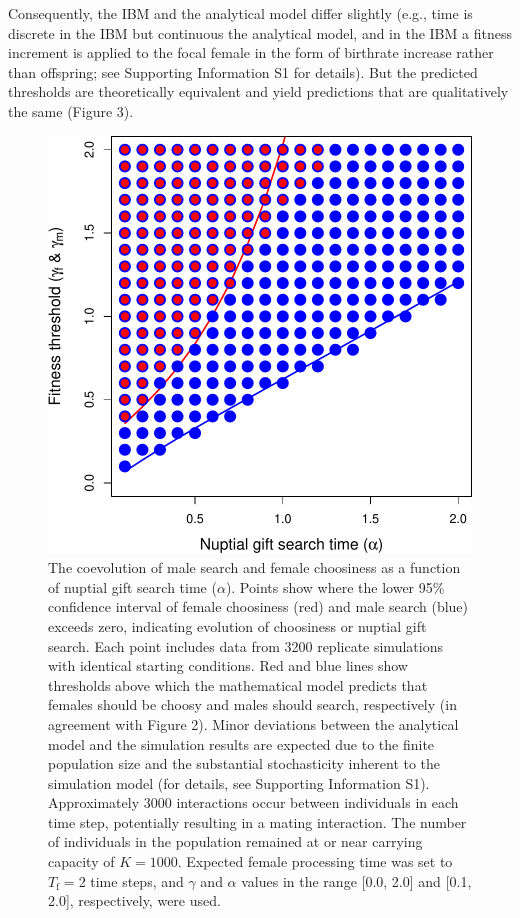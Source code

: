 \documentclass[
]{article}
\begin{document}
Consequently, the IBM and the analytical model differ slightly (e.g.,
time is discrete in the IBM but continuous the analytical model, and in
the IBM a fitness increment is applied to the focal female in the form
of birthrate increase rather than offspring; see Supporting Information
S1 for details). But the predicted thresholds are theoretically
equivalent and yield predictions that are qualitatively the same (Figure
3).

\begin{figure}
\centering
\includegraphics{ms_refs_fixed_files/figure-latex/unnamed-chunk-4-1.pdf}
\caption{The coevolution of male search and female choosiness as a
function of nuptial gift search time (\(\alpha\)). Points show where the
lower 95\% confidence interval of female choosiness (red) and male
search (blue) exceeds zero, indicating evolution of choosiness or
nuptial gift search. Each point includes data from 3200 replicate
simulations with identical starting conditions. Red and blue lines show
thresholds above which the mathematical model predicts that females
should be choosy and males should search, respectively (in agreement
with Figure 2). Minor deviations between the analytical model and the
simulation results are expected due to the finite population size and
the substantial stochasticity inherent to the simulation model (for
details, see Supporting Information S1). Approximately 3000 interactions
occur between individuals in each time step, potentially resulting in a
mating interaction. The number of individuals in the population remained
at or near carrying capacity of \(K = 1000\). Expected female processing
time was set to \(T_{\mathrm{f}}=2\) time steps, and \(\gamma\) and
\(\alpha\) values in the range {[}0.0, 2.0{]} and {[}0.1, 2.0{]},
respectively, were used.}
\end{figure}
\end{document}
